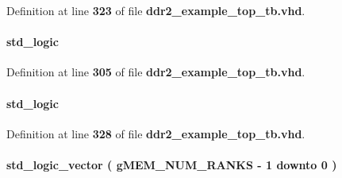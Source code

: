 Definition at line {\bf 323} of file {\bf ddr2\+\_\+example\+\_\+top\+\_\+tb.\+vhd}.

\paragraph[{cas\+\_\+n}]{ {\bfseries \textcolor{comment}{std\+\_\+logic}\textcolor{vhdlchar}{ }} \hspace{0.3cm}{\ttfamily [Signal]}}\label{classddr2__example__top__tb_1_1rtl_aed70e095f4de8229927983d138977f1c}


Definition at line {\bf 305} of file {\bf ddr2\+\_\+example\+\_\+top\+\_\+tb.\+vhd}.

\paragraph[{cas\+\_\+n\+\_\+delayed}]{ {\bfseries \textcolor{comment}{std\+\_\+logic}\textcolor{vhdlchar}{ }} \hspace{0.3cm}{\ttfamily [Signal]}}\label{classddr2__example__top__tb_1_1rtl_ab86e9b9ebdc8493b3b57c22f95c38634}


Definition at line {\bf 328} of file {\bf ddr2\+\_\+example\+\_\+top\+\_\+tb.\+vhd}.

\paragraph[{cke}]{ {\bfseries \textcolor{comment}{std\+\_\+logic\+\_\+vector}\textcolor{vhdlchar}{ }\textcolor{vhdlchar}{(}\textcolor{vhdlchar}{ }\textcolor{vhdlchar}{ }\textcolor{vhdlchar}{ }\textcolor{vhdlchar}{ }{\bfseries {\bf g\+M\+E\+M\+\_\+\+N\+U\+M\+\_\+\+R\+A\+N\+KS}} \textcolor{vhdlchar}{-\/}\textcolor{vhdlchar}{ } \textcolor{vhdldigit}{1} \textcolor{vhdlchar}{ }\textcolor{keywordflow}{downto}\textcolor{vhdlchar}{ }\textcolor{vhdlchar}{ } \textcolor{vhdldigit}{0} \textcolor{vhdlchar}{ }\textcolor{vhdlchar}{)}\textcolor{vhdlchar}{ }} \hspace{0.3cm}{\ttfamily [Signal]}}\label{classddr2__example__top__tb_1_1rtl_af79110ac02f71baa607333bd79b2146f}


